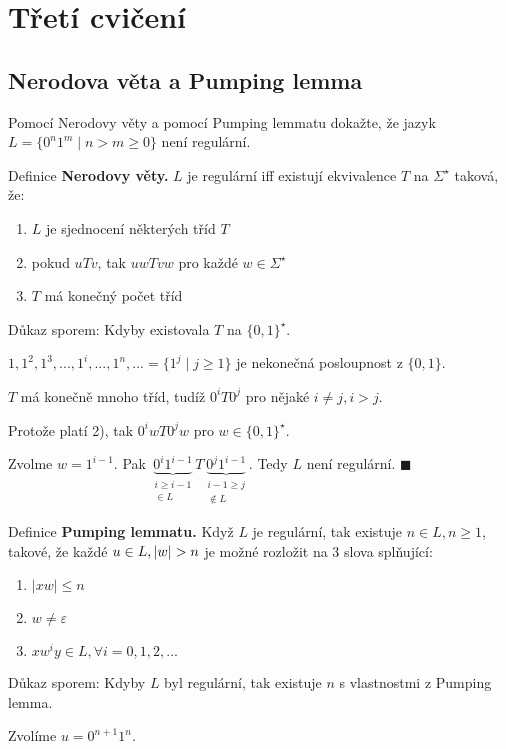 \section{Třetí cvičení}

\subsection{Nerodova věta a Pumping lemma}
Pomocí Nerodovy věty a pomocí Pumping lemmatu dokažte, že jazyk $L = \{0^n 1^m \mid n > m \geq 0\}$ není regulární.

\noindent
Definice \textbf{Nerodovy věty.} $L$ je regulární iff existují ekvivalence $T$ na $\Sigma^\star$ taková, že:
\begin{enumerate}[1), noitemsep]
    \item $L$ je sjednocení některých tříd $T$
    \item pokud $uTv$, tak $uwTvw$ pro každé $w \in \Sigma^\star$
    \item $T$ má konečný počet tříd
\end{enumerate}
Důkaz sporem:
Kdyby existovala $T$ na $\{0,1\}^\star$.

$1, 1^2, 1^3, ..., 1^i, ..., 1^n, ... = \{1^j \mid j \geq 1\}$ je nekonečná posloupnost z $\{0,1\}$.

$T$ má konečně mnoho tříd, tudíž $0^i T 0^j$ pro nějaké $i \not= j, i>j$.

Protože platí 2), tak $0^i w T 0^j w$ pro $w \in \{0,1\}^\star$.

Zvolme $w = 1^{i-1}$. Pak $\underbrace{0^i 1^{i-1}}_{\substack{i \geq i-1 \\ \in L}} T 
\underbrace{0^j 1^{i-1}}_{\substack{i-1 \geq j  \\\not\in L }}$. Tedy $L$ není regulární. $\blacksquare$

\noindent
Definice \textbf{Pumping lemmatu.} Když $L$ je regulární, tak existuje $n \in L, n \geq 1$, takové, že každé ${u \in L},\\
|w| > n$ je 
možné rozložit na 3 slova splňující:
\begin{enumerate}[1), noitemsep]
    \item $|xw| \leq n$
    \item $w \not= \varepsilon$
    \item $xw^i y \in L, \forall i = 0, 1, 2, ...$
\end{enumerate}
Důkaz sporem:
Kdyby $L$ byl regulární, tak existuje $n$ s vlastnostmi z Pumping lemma.

Zvolíme $u = 0^{n+1} 1^n$.

